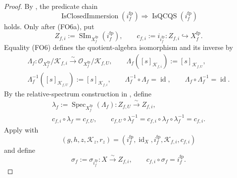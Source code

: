 \begin{proof}
  By , the predicate chain
  \[
    \operatorname{IsClosedImmersion}(i_f^{\mathrm{fp}})
      \Longrightarrow\operatorname{IsQCQS}(i_f^{\mathrm{fp}})    \tag{FO6a}
  \]
  holds.  Only after (FO6a), put
  \[
    Z_{f,i}:=\operatorname{SIm}_{X_f^{\mathrm{fp}}}
      (i_f^{\mathrm{fp}}),
    \qquad
    c_{f,i}:=i_{i_f^{\mathrm{fp}}}\colon
      Z_{f,i}\hookrightarrow X_f^{\mathrm{fp}}.                  \tag{FO7}
  \]
  Equality (FO6) defines the quotient-algebra isomorphism and its inverse by
  \[
  \begin{gathered}
    \Lambda_f\colon
      \mathcal O_{X_f^{\mathrm{fp}}}/\mathcal K_{f,i}
        \xrightarrow{\sim}
      \mathcal O_{X_f^{\mathrm{fp}}}/\mathcal K_{f,U},
    \qquad
    \Lambda_f([s]_{\mathcal K_{f,i}}):=[s]_{\mathcal K_{f,U}},\\
    \Lambda_f^{-1}([s]_{\mathcal K_{f,U}}):=[s]_{\mathcal K_{f,i}},
    \qquad
    \Lambda_f^{-1}\circ\Lambda_f=\operatorname{id},
    \qquad
    \Lambda_f\circ\Lambda_f^{-1}=\operatorname{id}.
  \end{gathered}                                                    \tag{FO7a}
  \]
  By the relative-spectrum construction in
  , define
  \[
  \begin{gathered}
    \lambda_f:=\operatorname{Spec}_{X_f^{\mathrm{fp}}}(\Lambda_f)
      \colon Z_{f,U}\xrightarrow{\sim}Z_{f,i},\\
    c_{f,i}\circ\lambda_f=c_{f,U},
    \qquad
    c_{f,U}\circ\lambda_f^{-1}
      =c_{f,i}\circ\lambda_f\circ\lambda_f^{-1}=c_{f,i}.
  \end{gathered}                                                    \tag{FO7b}
  \]
  Apply  with
  \[
    (g,h,z,\mathcal K_z,r_z)=
      (i_f^{\mathrm{fp}},\operatorname{id}_X,i_f^{\mathrm{fp}},
        \mathcal K_{f,i},c_{f,i})
  \]
  and define
  \[
    \sigma_f:=\sigma_{i_f^{\mathrm{fp}}}\colon X\xrightarrow{\sim}Z_{f,i},
    \qquad
    c_{f,i}\circ\sigma_f=i_f^{\mathrm{fp}}.                      \tag{FO8}
  \]


\end{proof}
